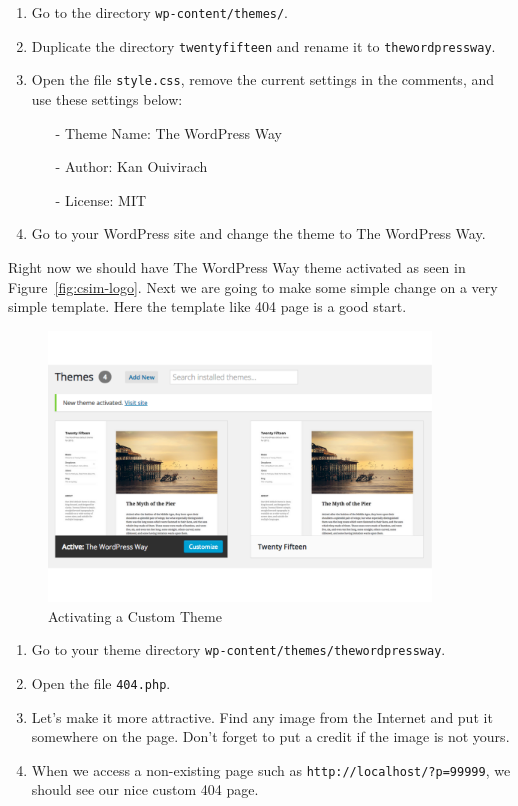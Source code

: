 \documentclass{article}
\begin{document}
\begin{enumerate}
    \item Go to the directory {\tt wp-content/themes/}.
    \item Duplicate the directory {\tt twentyfifteen} and rename it
        to {\tt thewordpressway}.
    \item Open the file {\tt style.css}, remove the current settings in the
        comments, and use these settings below:
        \begin{itemize}
            \item[-] Theme Name: The WordPress Way
            \item[-] Author: Kan Ouivirach
            \item[-] License: MIT
        \end{itemize}
    \item Go to your WordPress site and change the theme to The WordPress Way.
\end{enumerate}

\noindent Right now we should have The WordPress Way theme activated as seen in
Figure~\ref{fig:csim-logo}. Next we are going to make some simple change on a
very simple template. Here the template like 404 page is a good start.

\FloatBarrier

\begin{figure}[t]
    \centering
    \includegraphics[width=4in]{figures/activating-custom-theme}
    \caption{Activating a Custom Theme}
    \label{fig:activating-custom-theme}
\end{figure}

\begin{enumerate}
    \item Go to your theme directory {\tt wp-content/themes/thewordpressway}.
    \item Open the file {\tt 404.php}.
    \item Let's make it more attractive. Find any image from the Internet and
        put it somewhere on the page. Don't forget to put a credit if the
        image is not yours.
    \item When we access a non-existing page such as
        {\tt http://localhost/?p=99999}, we should see our nice custom
        404 page.
\end{enumerate}
\end{document}

